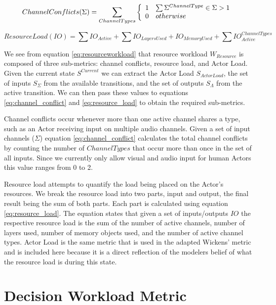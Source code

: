 \begin{equation}
  ChannelConflicts(\Sigma) = \sum_{ChannelTypes} \left\{
    \begin{array}{l l}
      1 & \sum \Sigma^{ChannelType} \in \Sigma > 1 \\
      0 & otherwise \\
    \end{array}
    \right.
  \label{eq:channel_conflict}
\end{equation}

\begin{equation}
  ResourceLoad(IO) = \sum IO_{Active} + \sum IO_{LayersUsed} + IO_{MemoryUsed} + \sum IO_{Active}^{ChannelTypes}
  \label{eq:resource_load}
\end{equation}

We see from equation \ref{eq:resourceworkload} that resource workload $W_{Resource}$ is composed of three sub-metrics: channel conflicts, resource load, and Actor Load.  Given the current state $S^{Current}$ we can extract the Actor Load $S_{Actor Load}$, the set of inputs $S_{\Sigma}$ from the available transitions, and the set of outputs $S_{\Lambda}$ from the active transition.  We can then pass these values to equations \ref{eq:channel_conflict} and \ref{eq:resource_load} to obtain the required sub-metrics.

Channel conflicts occur whenever more than one active channel shares a type, such as an Actor receiving input on multiple audio channels.  Given a set of input channels ($\Sigma$) equation \ref{eq:channel_conflict} calculates the total channel conflicts by counting the number of $ChannelTypes$ that occur more than once in the set of all inputs.  Since we currently only allow visual and audio input for human Actors this value ranges from 0 to 2.  

Resource load attempts to quantify the load being placed on the Actor's resources.  We break the resource load into two parts, input and output, the final result being the sum of both parts.  Each part is calculated using equation \ref{eq:resource_load}.  The equation states that given a set of inputs/outputs $IO$ the respective resource load is the sum of the number of active channels, number of layers used, number of memory objects used, and the number of active channel types.  Actor Load is the same metric that is used in the adapted Wickens' metric and is included here because it is a direct reflection of the modelers belief of what the resource load is during this state.


\section{Decision Workload Metric}

